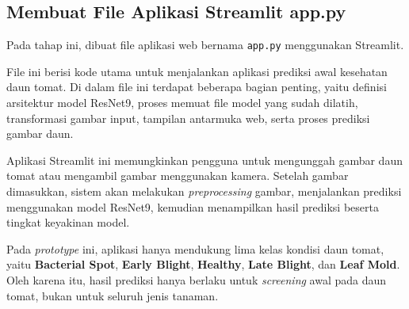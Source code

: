 \subsection{Membuat File Aplikasi Streamlit app.py}

Pada tahap ini, dibuat file aplikasi web bernama \texttt{app.py} menggunakan Streamlit.

File ini berisi kode utama untuk menjalankan aplikasi prediksi awal kesehatan daun tomat. Di dalam file ini terdapat beberapa bagian penting, yaitu definisi arsitektur model ResNet9, proses memuat file model yang sudah dilatih, transformasi gambar input, tampilan antarmuka web, serta proses prediksi gambar daun.

Aplikasi Streamlit ini memungkinkan pengguna untuk mengunggah gambar daun tomat atau mengambil gambar menggunakan kamera. Setelah gambar dimasukkan, sistem akan melakukan \textit{preprocessing} gambar, menjalankan prediksi menggunakan model ResNet9, kemudian menampilkan hasil prediksi beserta tingkat keyakinan model.

Pada \textit{prototype} ini, aplikasi hanya mendukung lima kelas kondisi daun tomat, yaitu \textbf{Bacterial Spot}, \textbf{Early Blight}, \textbf{Healthy}, \textbf{Late Blight}, dan \textbf{Leaf Mold}. Oleh karena itu, hasil prediksi hanya berlaku untuk \textit{screening} awal pada daun tomat, bukan untuk seluruh jenis tanaman.

